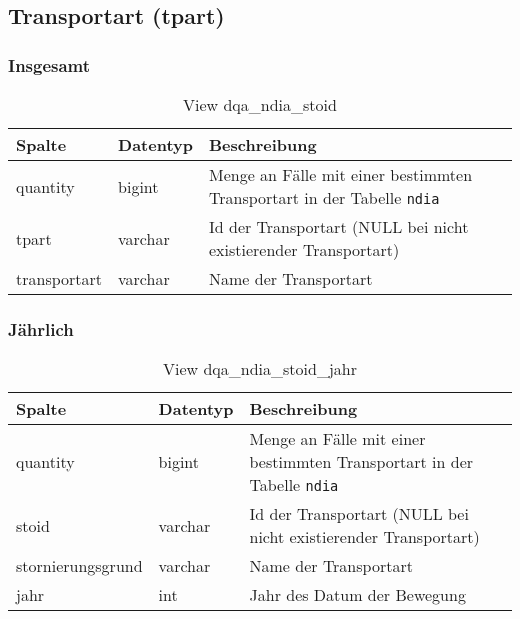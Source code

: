 \subsection{Transportart (tpart)} \label{subsec:bewTpart}

\subsubsection{Insgesamt} \label{subsubsec:bewTpartI}

\begin{table}[ht]
	\centering   
	\caption{View dqa\_ndia\_stoid}
	\label{tab:bewTpartI}
	\begin{tabular}{||l|l|p{10cm}||}   		
		\hline
		Spalte & Datentyp & Beschreibung \\ [0.5ex]
		\hline\hline
		quantity & bigint & Menge an Fälle mit einer bestimmten Transportart in der Tabelle \texttt{ndia} \\
		\hline
		tpart & varchar & Id der Transportart (NULL bei nicht existierender Transportart)\\
		\hline
		transportart & varchar & Name der Transportart \\
		\hline
	\end{tabular}
\end{table}

\newpage

\subsubsection{Jährlich} \label{subsubsec:bewTpartJ}

\begin{table}[ht]
	\centering   
	\caption{View dqa\_ndia\_stoid\_jahr}
	\label{tab:bewTpartJ}
	\begin{tabular}{||l|l|p{10cm}||}
		\hline
		Spalte & Datentyp & Beschreibung \\ [0.5ex]
		\hline\hline
		quantity & bigint & Menge an Fälle mit einer bestimmten Transportart in der Tabelle \texttt{ndia}\\
		\hline
		stoid & varchar & Id der Transportart (NULL bei nicht existierender Transportart)\\
		\hline
		stornierungsgrund & varchar & Name der Transportart \\
		\hline
		jahr & int &  Jahr des Datum der Bewegung \\
		\hline		
	\end{tabular}
\end{table}

